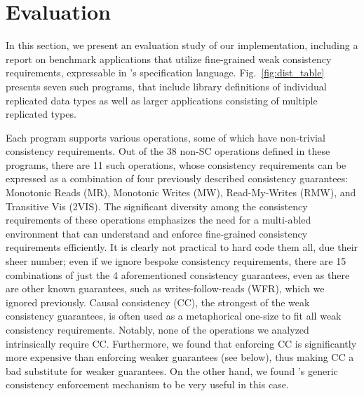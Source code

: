 \section{Evaluation}
\label{sec:eval}
%
In this section, we present an evaluation study of our implementation,
including a report on
benchmark applications that utilize fine-grained weak consistency
requirements, expressable
in \tool's specification language.
Fig.~\ref{fig:dist_table} presents seven such programs, that include
library definitions of individual replicated data types as well as
larger applications consisting of multiple replicated types. 

Each program supports various operations, some of which have
non-trivial consistency requirements. Out of the 38 non-SC operations
defined in these programs, there are 11 such operations, whose
consistency requirements can be expressed as a combination of four
previously described consistency guarantees: Monotonic Reads (MR),
Monotonic Writes (MW), Read-My-Writes (RMW), and Transitive Vis
(2VIS). The significant diversity among the consistency requirements
of these operations emphasizes the need for a multi-abled environment
that can understand and enforce fine-grained consistency requirements
efficiently. It is clearly not practical to hard code them all, due
their sheer number; even if we ignore bespoke consistency
requirements, there are 15 combinations of just the 4 aforementioned
consistency guarantees, even as there are other known guarantees, such
as writes-follow-reads (WFR), which we ignored previously.  Causal
consistency (CC), the strongest of the weak consistency guarantees, is
often used as a metaphorical one-size to fit all weak consistency
requirements.  Notably, none of the operations we analyzed
intrinsically require CC.  Furthermore, we found that enforcing CC is
significantly more expensive than enforcing weaker guarantees (see
below), thus making CC a bad substitute for weaker guarantees. On the
other hand, we found \tool's generic consistency enforcement mechanism
to be very useful in this case.

